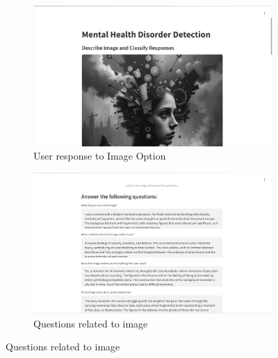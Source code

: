 \begin{figure}[H]
    \begin{subfigure}[b]{0.495\textwidth}
        \centering
        \includegraphics[width=\textwidth]{App Images/26 Interface.png}
        \caption{User response to Image Option}
        \label{fig:26Interface}
    \end{subfigure}
    \hfill
    \begin{subfigure}[b]{0.495\textwidth}
        \centering
        \includegraphics[width=\textwidth]{App Images/27 Interface.png}
        \caption{Questions related to image}
        \label{fig:27Interface}
    \end{subfigure}

    \vspace{1em}


\end{figure}
